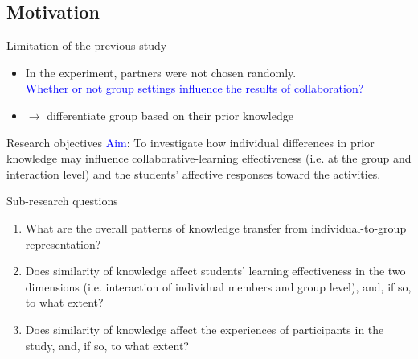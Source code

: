 \subsection{Motivation}
\begin{frame}{Limitation of the previous study}
    \begin{itemize}
        \item <1-> In the experiment, partners were not chosen randomly.\\
        \textcolor{blue}{Whether or not group settings influence the
        results of collaboration?}
        \item <2>$\longrightarrow$ differentiate group based on their prior knowledge
        
    \end{itemize}
\end{frame}
\begin{frame}{Research objectives}
\textcolor{blue}{Aim}:
    To investigate how individual differences in prior knowledge may influence collaborative-learning effectiveness (i.e. at the group and interaction level) 
    and the students' affective responses toward the activities.
{
\begin{block}{Sub-research questions}
    \begin{enumerate}
    \item <1> What are the overall patterns of knowledge transfer from individual-to-group representation?
    \item <2> Does similarity of knowledge affect students' learning
    effectiveness in the two dimensions (i.e. interaction of individual 
    members and group level), and, if so, to what extent?
    \item <3> Does similarity of knowledge affect the experiences of
    participants in the study, and, if so, to what extent?
\end{enumerate}
\end{block}
}
\end{frame}

